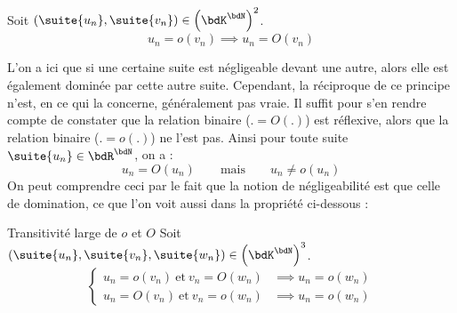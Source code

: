 \documentclass[a4paper,french,bookmarks]{article}
\begin{document}

\begin{property}{}{}
    Soit $\left(\suite{u_n}, \suite{v_n}\right) \in \left(\bdK^\bdN\right)^2$. 
    \[ u_n = o(v_n) \implies u_n = O(v_n)\]
\end{property}


L'on a ici que si une certaine suite est négligeable devant une autre, alors elle est également dominée par cette autre suite. Cependant, la réciproque de ce principe n'est, en ce qui la concerne, généralement pas vraie. Il suffit pour s'en rendre compte de constater que la relation binaire  ($. = O(.)$) est réflexive, alors que la relation binaire  ($. = o(.)$) ne l'est pas. Ainsi pour toute suite $\suite{u_n} \in \bdR^\bdN$, on a :
\[ u_n = O(u_n) \qquad \text{mais} \qquad u_n \neq o(u_n) \]
On peut comprendre ceci par le fait que la notion de négligeabilité est  que celle de domination, ce que l'on voit aussi dans la propriété ci-dessous  :

\begin{property}{Transitivité large de $o$ et $O$}{}
      Soit $\left(\suite{u_n}, \suite{v_n}, \suite{w_n}\right) \in \left(\bdK^\bdN\right)^3$.
      \[ \left\lbrace\begin{array}{ll}
          u_n = o(v_n) \ \text{et} \ v_n = O(w_n) &\implies u_n = o(w_n)  \\
          u_n = O(v_n) \ \text{et} \ v_n = o(w_n) &\implies u_n = o(w_n) 
      \end{array}\right.\]
\end{property}
\end{document}
